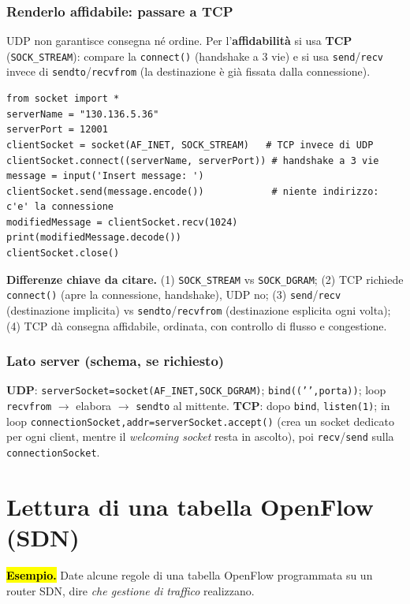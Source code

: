 \documentclass[11pt,a4paper]{report}
\begin{document}
\subsubsection*{Renderlo affidabile: passare a TCP}
UDP non garantisce consegna né ordine. Per l'\textbf{affidabilità} si usa
\textbf{TCP} (\texttt{SOCK\_STREAM}): compare la \texttt{connect()} (handshake a
3 vie) e si usa \texttt{send}/\texttt{recv} invece di \texttt{sendto}/\texttt{recvfrom}
(la destinazione è già fissata dalla connessione).
\begin{verbatim}
from socket import *
serverName = "130.136.5.36"
serverPort = 12001
clientSocket = socket(AF_INET, SOCK_STREAM)   # TCP invece di UDP
clientSocket.connect((serverName, serverPort)) # handshake a 3 vie
message = input('Insert message: ')
clientSocket.send(message.encode())            # niente indirizzo: c'e' la connessione
modifiedMessage = clientSocket.recv(1024)
print(modifiedMessage.decode())
clientSocket.close()
\end{verbatim}
\textbf{Differenze chiave da citare.} (1) \texttt{SOCK\_STREAM} vs
\texttt{SOCK\_DGRAM}; (2) TCP richiede \texttt{connect()} (apre la connessione,
handshake), UDP no; (3) \texttt{send}/\texttt{recv} (destinazione implicita) vs
\texttt{sendto}/\texttt{recvfrom} (destinazione esplicita ogni volta); (4) TCP dà
consegna affidabile, ordinata, con controllo di flusso e congestione.

\subsubsection*{Lato server (schema, se richiesto)}
\textbf{UDP}: \texttt{serverSocket=socket(AF\_INET,SOCK\_DGRAM)};
\texttt{bind((’’,porta))}; loop \texttt{recvfrom} $\to$ elabora $\to$
\texttt{sendto} al mittente. \textbf{TCP}: dopo \texttt{bind}, \texttt{listen(1)};
in loop \texttt{connectionSocket,addr=serverSocket.accept()} (crea un socket
dedicato per ogni client, mentre il \emph{welcoming socket} resta in ascolto),
poi \texttt{recv}/\texttt{send} sulla \texttt{connectionSocket}.

\section{Lettura di una tabella OpenFlow (SDN)}
\label{teoria:openflow}
\hl{\textbf{Esempio.}} Date alcune regole di una tabella
OpenFlow programmata su un router SDN, dire \emph{che gestione di traffico}
realizzano.
\end{document}
